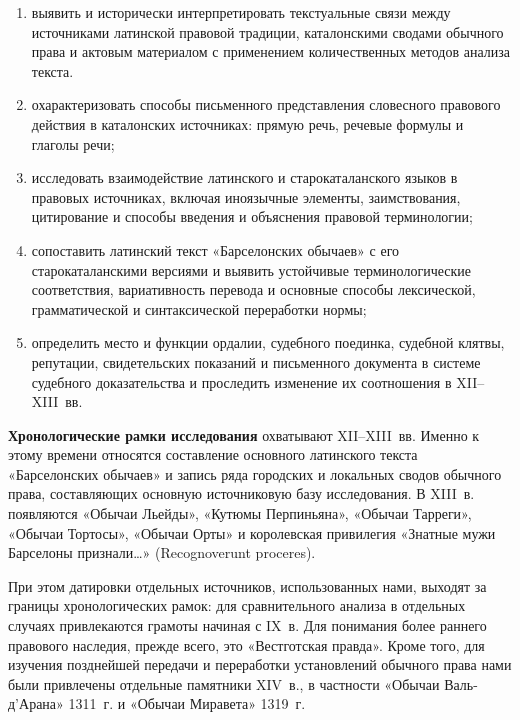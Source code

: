 \begin{enumerate}
\setlength{\itemsep}{0pt}
\item выявить и исторически интерпретировать текстуальные связи между источниками латинской правовой традиции, каталонскими сводами обычного права и актовым материалом с применением количественных методов анализа текста.
\item охарактеризовать способы письменного представления словесного правового действия в каталонских источниках: прямую речь, речевые формулы и глаголы речи;
\item исследовать взаимодействие латинского и старокаталанского языков в правовых источниках, включая иноязычные элементы, заимствования, цитирование и способы введения и объяснения правовой терминологии;
\item сопоставить латинский текст «Барселонских обычаев» с его старокаталанскими версиями и выявить устойчивые терминологические соответствия, вариативность перевода и основные способы лексической, грамматической и синтаксической переработки нормы;
\item определить место и функции ордалии, судебного поединка, судебной клятвы, репутации, свидетельских показаний и письменного документа в системе судебного доказательства и проследить изменение их соотношения в XII--XIII~вв.
\end{enumerate}

\textbf{Х}\textbf{ронологические рамки исследования} охватывают XII--XIII~вв. Именно к этому времени относятся составление основного латинского текста «Барселонских обычаев» и запись ряда городских и локальных сводов обычного права, составляющих основную источниковую базу исследования. В XIII~в. появляются «Обычаи Льейды», «Кутюмы Перпиньяна», «Обычаи Тарреги», «Обычаи Тортосы», «Обычаи Орты» и королевская привилегия «Знатные мужи Барселоны признали…» (Recognoverunt proceres).

При этом датировки отдельных источников, использованных нами, выходят за границы хронологических рамок: для сравнительного анализа в отдельных случаях привлекаются грамоты начиная с IX~в. Для понимания более раннего правового наследия, прежде всего, это «Вестготская правда». Кроме того, для изучения позднейшей передачи и переработки установлений обычного права нами были привлечены отдельные памятники XIV~в., в частности «Обычаи Валь-д’Арана» 1311~г. и «Обычаи Миравета» 1319~г.

